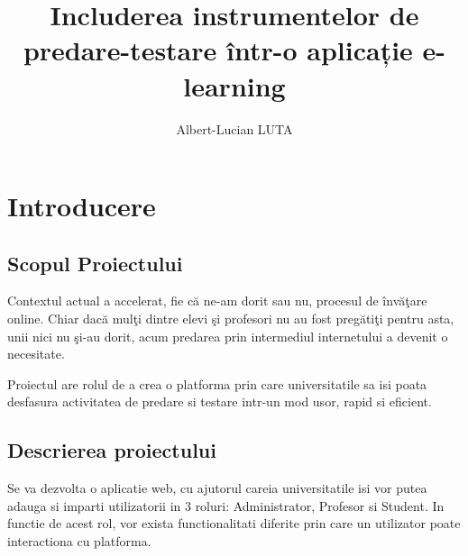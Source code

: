 \documentclass[12pt, a4paper, oneside, romanian]{teza-upb}
\begin{document}
\author{Albert-Lucian LUTA}

\title{Includerea instrumentelor de predare-testare într-o aplicație e-learning}




\beforepreface
\listoffigures
\listoftables
{}
\afterpreface 

\chapter*{Introducere}

\section{Scopul Proiectului}

Contextul actual a accelerat, fie că ne-am dorit sau nu, procesul de învăţare online. Chiar dacă mulţi dintre elevi şi profesori nu au fost pregătiţi pentru asta, unii nici nu şi-au dorit, acum predarea prin intermediul internetului a devenit o necesitate.\cite{liferoplatform}

Proiectul are rolul de a crea o platforma prin care universitatile sa isi poata desfasura activitatea de predare si testare intr-un mod usor, rapid si eficient.

\section{Descrierea proiectului}

Se va dezvolta o aplicatie web, cu ajutorul careia universitatile isi vor putea adauga si imparti utilizatorii in 3 roluri: Administrator, Profesor si Student. In functie de acest rol, vor exista functionalitati diferite prin care un utilizator poate interactiona cu platforma.
\end{document}
